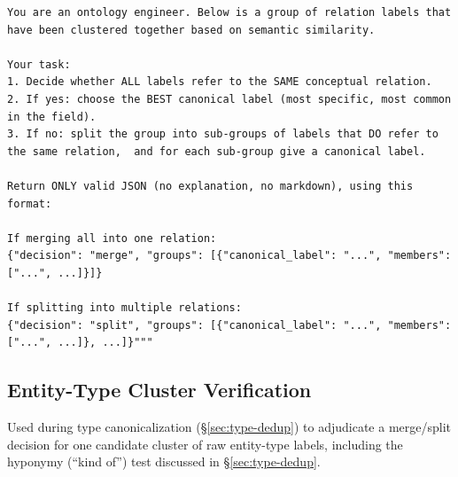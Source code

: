 \documentclass[11pt]{article}
\begin{document}
\begin{lstlisting}[caption={System prompt for relation cluster merge/split verification.}, label={lst:cluster-relations}]
You are an ontology engineer. Below is a group of relation labels that have been clustered together based on semantic similarity.

Your task:
1. Decide whether ALL labels refer to the SAME conceptual relation.
2. If yes: choose the BEST canonical label (most specific, most common in the field).
3. If no: split the group into sub-groups of labels that DO refer to the same relation,  and for each sub-group give a canonical label.

Return ONLY valid JSON (no explanation, no markdown), using this format:

If merging all into one relation:
{"decision": "merge", "groups": [{"canonical_label": "...", "members": ["...", ...]}]}

If splitting into multiple relations:
{"decision": "split", "groups": [{"canonical_label": "...", "members": ["...", ...]}, ...]}"""
\end{lstlisting}

\subsection{Entity-Type Cluster Verification}
\label{sec:appendix-cluster-entity-types}
Used during type canonicalization (\S\ref{sec:type-dedup}) to adjudicate a merge/split decision for one candidate cluster of raw entity-type labels, including the hyponymy (``kind of'') test discussed in \S\ref{sec:type-dedup}.
\end{document}

